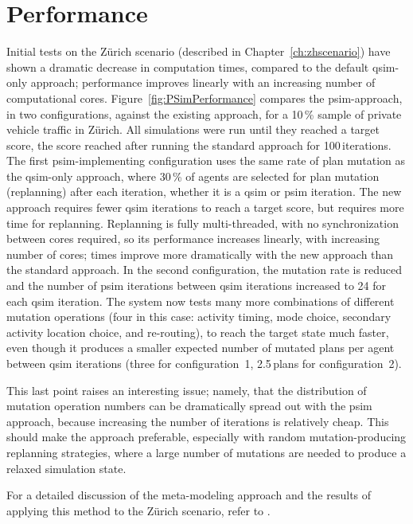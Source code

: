 \section{Performance}
Initial tests on the Zürich scenario (described in Chapter~\ref{ch:zhscenario}) have shown a dramatic decrease in computation times, compared to the default \gls{qsim}-only approach; performance improves linearly with an increasing number of computational cores.
Figure~\ref{fig:PSimPerformance} compares the \gls{psim}-approach, in two configurations, against the existing approach, for a 10\,\% sample of private vehicle traffic in Zürich. All simulations were run until they reached a target score, \ie the score reached after running the standard approach for 100\,iterations. The first \gls{psim}-implementing configuration uses the same rate of plan mutation as the \gls{qsim}-only approach, where 30\,\% of agents are selected for plan mutation (replanning) after each iteration, whether it is a \gls{qsim} or \gls{psim} iteration. The new approach requires fewer \gls{qsim} iterations to reach a target score, but requires more time for replanning. Replanning is fully multi-threaded, with no synchronization between cores required, so its performance increases linearly, with increasing number of cores; times improve more dramatically with the new approach than the standard approach.
In the second configuration, the mutation rate is reduced and the number of \gls{psim} iterations between \gls{qsim} iterations increased to 24 for each \gls{qsim} iteration. The system now tests many more combinations of different mutation operations (four in this case: activity timing, mode choice, secondary activity location choice, and re-routing), to reach the target state much faster, even though it produces a smaller expected number of mutated plans per agent between \gls{qsim} iterations (three for configuration~1, 2.5\,plans for configuration~2).

This last point raises an interesting issue; namely, that the distribution of mutation operation numbers can be dramatically spread out with the \gls{psim} approach, because increasing the number of iterations is relatively cheap. This should make the approach preferable, especially with random mutation-producing replanning strategies, where a large number of mutations are needed to produce a relaxed simulation state.

For a detailed discussion of the meta-modeling approach and the results of applying this method to the Zürich scenario, refer to \citet[][]{FourieEtAl_TRR_2013}.

